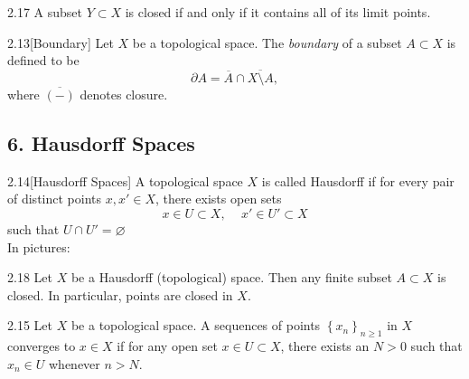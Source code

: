 \begin{customcoro}{2.17}
A subset $Y \subset X$ is closed if and only if it contains all of its limit points.
\end{customcoro}

\begin{customdefinition}{2.13}[Boundary]
Let $X$ be a topological space. The \emph{boundary} of a subset $A \subset X$ is defined to be
$$\partial A = \overline{A} \cap \overline{X \setminus A},$$
where $\overline{(-)}$ denotes closure.
\end{customdefinition}

\subsection*{6. Hausdorff Spaces}

\begin{customdefinition}{2.14}[Hausdorff Spaces]
A topological space $X$ is called Hausdorff if for every pair of distinct points $x, x' \in X$, there exists open sets 
$$x \in U \subset X,\,\,\,\,\,\,\, x' \in U' \subset X$$
such that $U \cap U' = \varnothing$\\
In pictures:
    \begin{center}
    \end{center}
\end{customdefinition}

\begin{customthm}{2.18}
Let $X$ be a Hausdorff (topological) space. Then any finite subset $A \subset X$ is closed. In particular, points are closed in $X$. 
\end{customthm}

\begin{customdefinition}{2.15}
Let $X$ be a topological space. A sequences of points $\left\{x_n\right\}_{n \geqslant 1}$ in $X$ converges to $x \in X$ if for any open set $x \in U \subset X$, there exists an $N > 0$ such that $x_n \in U$ whenever $n>N$.
\end{customdefinition}


